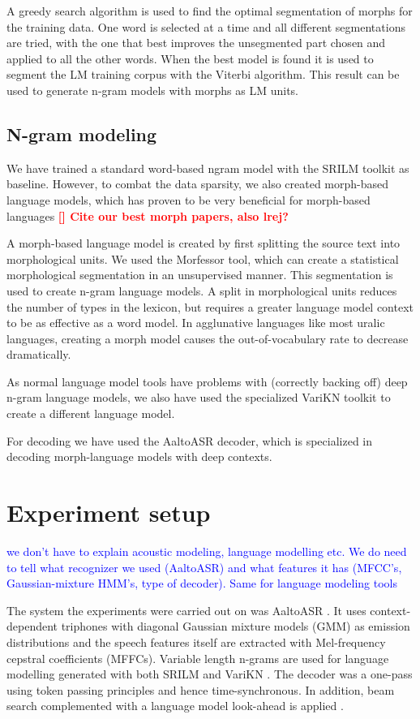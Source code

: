 \documentclass[b5paper]{article}
\newcommand{\todo}[2]{{\textcolor{red}{\bf [#1] #2 }}}
\newcommand{\note}[1]{{\textcolor{blue}{#1}}}
\begin{document}
A greedy search algorithm is used to find the optimal segmentation of morphs for the training data. One word is selected at a time and all different segmentations are tried, with the one that best improves the unsegmented part chosen and applied to all the other words. When the best model is found it is used to segment the LM training corpus with the Viterbi algorithm. This result can be used to generate n-gram models with morphs as LM units.



\subsection{N-gram modeling}
We have trained a standard word-based ngram model with the SRILM toolkit as baseline. However, to combat the data sparsity, we also created morph-based language models, which has proven to be very beneficial for morph-based languages \todo{}{Cite our best morph papers, also lrej?}

A morph-based language model is created by first splitting the source text into morphological units. We used the Morfessor tool, which can create a statistical morphological segmentation in an unsupervised manner. This segmentation is used to create n-gram language models. A split in morphological units reduces the number of types in the lexicon, but requires a greater language model context to be as effective as a word model. In agglunative languages like most uralic languages, creating a morph model causes the out-of-vocabulary rate to decrease dramatically.

As normal language model tools have problems with (correctly backing off) deep n-gram language models, we also have used the specialized VariKN toolkit to create a different language model.

For decoding we have used the AaltoASR decoder, which is specialized in decoding morph-language models with deep contexts.


\section{Experiment setup}

\note{we don't have to explain acoustic modeling, language modelling etc. We do need to tell what recognizer we used (AaltoASR) and what features it has (MFCC's, Gaussian-mixture HMM's, type of decoder). Same for language modeling tools}


The system the experiments were carried out on was AaltoASR \cite{hirsimaki2009importance}\cite{pylkkonen2005efficient}. It uses context-dependent triphones with diagonal Gaussian mixture models (GMM) as emission distributions and the speech features itself are extracted with Mel-frequency cepstral coefficients (MFFCs). Variable length n-grams are used for language modelling generated with both SRILM and VariKN \cite{siivola2007growing}\cite{siivola2007morfessor}. The decoder was a one-pass using token passing principles and hence time-synchronous. In addition, beam search complemented with a language model look-ahead is applied \cite{ortmanns1997look}.
\end{document}
